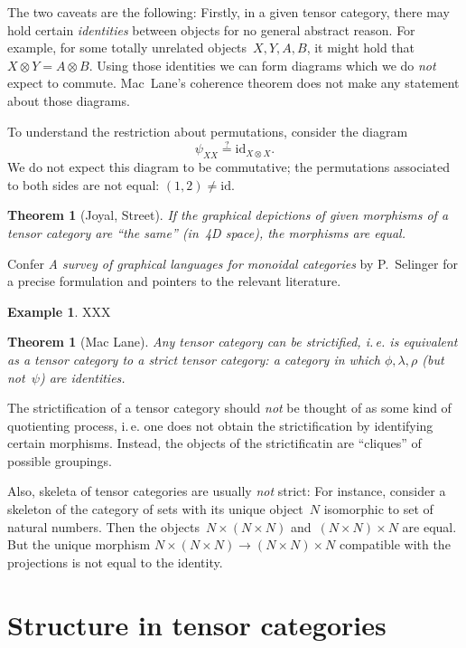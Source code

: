 \documentclass[a4paper,english,12pt]{scrartcl}
\theoremstyle{definition}
\newtheorem{ex}[defn]{Example}
\theoremstyle{plain}
\newtheorem{thm}[defn]{Theorem}
\theoremstyle{remark}
\newcommand{\id}{\mathrm{id}}
\renewcommand{\_}{\mathpunct{.}\,}
\newcommand{\?}{\,{:}\,}
\begin{document}
The two caveats are the following: Firstly, in a given tensor category, there
may hold certain \emph{identities} between objects for no general abstract
reason. For example, for some totally unrelated objects~$X,Y,A,B$, it might
hold that $X \otimes Y = A \otimes B$. Using those identities we can form
diagrams which we do \emph{not} expect to commute. Mac~Lane's coherence theorem
does not make any statement about those diagrams.

To understand the restriction about permutations, consider the diagram
\[ \psi_{XX} \stackrel{?}{=} \id_{X \otimes X}. \]
We do not expect this diagram to be commutative; the permutations associated to
both sides are not equal: $(1,2) \neq \id$.

\begin{thm}[Joyal, Street]If the graphical depictions of given morphisms of a
tensor category are ``the same'' (in~4D space), the morphisms are
equal.\end{thm}
Confer \emph{A survey of graphical languages for monoidal categories}
by P.~Selinger for a precise formulation and pointers to the relevant literature.

\begin{ex}XXX\end{ex}

\begin{thm}[Mac Lane]Any tensor category can be \emph{strictified}, i.\,e. is
equivalent as a tensor category to a \emph{strict} tensor category: a category
in which $\phi, \lambda, \rho$ (but not~$\psi$) are identities.\end{thm}

The strictification of a tensor category should \emph{not} be
thought of as some kind of quotienting process, i.\,e. one does not obtain the
strictification by identifying certain morphisms. Instead, the objects of the
strictificatin are ``cliques'' of possible groupings.

Also, skeleta of tensor categories are usually \emph{not} strict: For instance,
consider a skeleton of the category of sets with its unique object~$N$
isomorphic to set of natural numbers. Then the objects~$N \times (N \times N)$
and~$(N \times N) \times N$ are equal. But the unique morphism $N \times (N \times
N) \to (N \times N) \times N$ compatible with the projections is not equal to
the identity.


\section{Structure in tensor categories}
\end{document}
